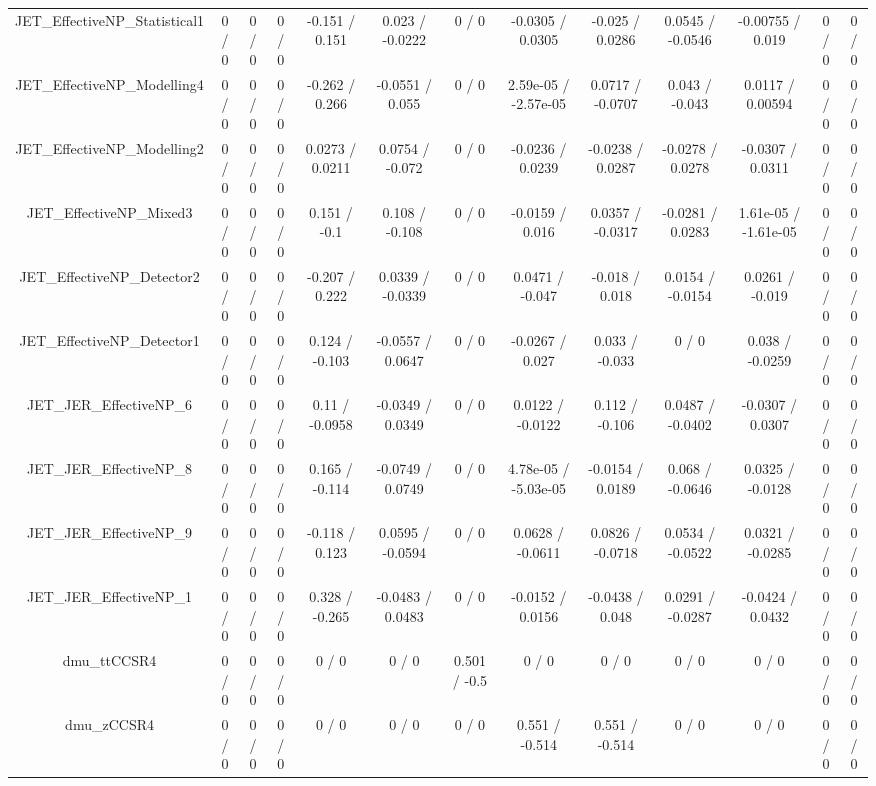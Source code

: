 \documentclass[10pt]{article}
\begin{document}
\begin{table}[htbp]
\begin{center}
\begin{tabular}{|c|c|c|c|c|c|c|c|c|c|c|c|c|}
  JET_EffectiveNP_Statistical1 & 0 / 0 & 0 / 0 & 0 / 0 & -0.151 / 0.151 & 0.023 / -0.0222 & 0 / 0 & -0.0305 / 0.0305 & -0.025 / 0.0286 & 0.0545 / -0.0546 & -0.00755 / 0.019 & 0 / 0 & 0 / 0 \\ 
  JET_EffectiveNP_Modelling4 & 0 / 0 & 0 / 0 & 0 / 0 & -0.262 / 0.266 & -0.0551 / 0.055 & 0 / 0 & 2.59e-05 / -2.57e-05 & 0.0717 / -0.0707 & 0.043 / -0.043 & 0.0117 / 0.00594 & 0 / 0 & 0 / 0 \\ 
  JET_EffectiveNP_Modelling2 & 0 / 0 & 0 / 0 & 0 / 0 & 0.0273 / 0.0211 & 0.0754 / -0.072 & 0 / 0 & -0.0236 / 0.0239 & -0.0238 / 0.0287 & -0.0278 / 0.0278 & -0.0307 / 0.0311 & 0 / 0 & 0 / 0 \\ 
  JET_EffectiveNP_Mixed3 & 0 / 0 & 0 / 0 & 0 / 0 & 0.151 / -0.1 & 0.108 / -0.108 & 0 / 0 & -0.0159 / 0.016 & 0.0357 / -0.0317 & -0.0281 / 0.0283 & 1.61e-05 / -1.61e-05 & 0 / 0 & 0 / 0 \\ 
  JET_EffectiveNP_Detector2 & 0 / 0 & 0 / 0 & 0 / 0 & -0.207 / 0.222 & 0.0339 / -0.0339 & 0 / 0 & 0.0471 / -0.047 & -0.018 / 0.018 & 0.0154 / -0.0154 & 0.0261 / -0.019 & 0 / 0 & 0 / 0 \\ 
  JET_EffectiveNP_Detector1 & 0 / 0 & 0 / 0 & 0 / 0 & 0.124 / -0.103 & -0.0557 / 0.0647 & 0 / 0 & -0.0267 / 0.027 & 0.033 / -0.033 & 0 / 0 & 0.038 / -0.0259 & 0 / 0 & 0 / 0 \\ 
  JET_JER_EffectiveNP_6 & 0 / 0 & 0 / 0 & 0 / 0 & 0.11 / -0.0958 & -0.0349 / 0.0349 & 0 / 0 & 0.0122 / -0.0122 & 0.112 / -0.106 & 0.0487 / -0.0402 & -0.0307 / 0.0307 & 0 / 0 & 0 / 0 \\ 
  JET_JER_EffectiveNP_8 & 0 / 0 & 0 / 0 & 0 / 0 & 0.165 / -0.114 & -0.0749 / 0.0749 & 0 / 0 & 4.78e-05 / -5.03e-05 & -0.0154 / 0.0189 & 0.068 / -0.0646 & 0.0325 / -0.0128 & 0 / 0 & 0 / 0 \\ 
  JET_JER_EffectiveNP_9 & 0 / 0 & 0 / 0 & 0 / 0 & -0.118 / 0.123 & 0.0595 / -0.0594 & 0 / 0 & 0.0628 / -0.0611 & 0.0826 / -0.0718 & 0.0534 / -0.0522 & 0.0321 / -0.0285 & 0 / 0 & 0 / 0 \\ 
  JET_JER_EffectiveNP_1 & 0 / 0 & 0 / 0 & 0 / 0 & 0.328 / -0.265 & -0.0483 / 0.0483 & 0 / 0 & -0.0152 / 0.0156 & -0.0438 / 0.048 & 0.0291 / -0.0287 & -0.0424 / 0.0432 & 0 / 0 & 0 / 0 \\ 
  dmu_ttCCSR4 & 0 / 0 & 0 / 0 & 0 / 0 & 0 / 0 & 0 / 0 & 0.501 / -0.5 & 0 / 0 & 0 / 0 & 0 / 0 & 0 / 0 & 0 / 0 & 0 / 0 \\ 
  dmu_zCCSR4 & 0 / 0 & 0 / 0 & 0 / 0 & 0 / 0 & 0 / 0 & 0 / 0 & 0.551 / -0.514 & 0.551 / -0.514 & 0 / 0 & 0 / 0 & 0 / 0 & 0 / 0 \\ 

\end{tabular}
\end{center}
\end{table}
\end{document}
